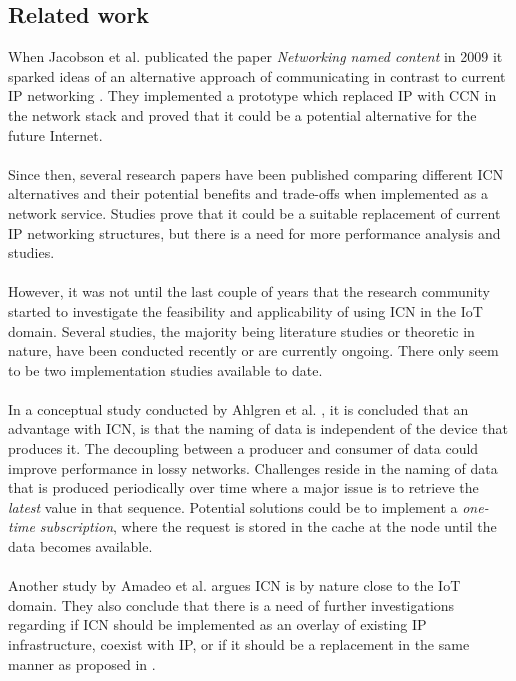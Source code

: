 \subsection{Related work}
When Jacobson et al. publicated the paper \textit{Networking named content} in 2009 it sparked ideas of an alternative approach of communicating in contrast to current IP networking \cite{Jacobson2009}. They implemented a prototype which replaced IP with CCN in the network stack and proved that it could be a potential alternative for the future Internet.\\\\
Since then, several research papers have been published comparing different ICN alternatives and their potential benefits and trade-offs when implemented as a network service\cite{Ahlgren2012}. Studies prove that it could be a suitable replacement of current IP networking structures, but there is a need for more performance analysis and studies\cite{Ahlgren2012}\cite{Greek-ICN-networking-survey-2014}.\\\\
However, it was not until the last couple of years that the research community started to investigate the feasibility and applicability of using ICN in the IoT domain. Several studies, the majority being literature studies or theoretic in nature, have been conducted recently or are currently ongoing. There only seem to be two implementation studies available to date.\\\\
In a conceptual study conducted by Ahlgren et al. \cite{Ahlgreniot}, it is concluded that an advantage with ICN, is that the naming of data is independent of the device that produces it. The decoupling between a producer and consumer of data could improve performance in lossy networks. Challenges reside in the naming of data that is produced periodically over time where a major issue is to retrieve the \textit{latest} value in that sequence. Potential solutions could be to implement a \textit{one-time subscription}, where the request is stored in the cache at the node until the data becomes available\cite{Ahlgreniot}.\\\\
Another study by Amadeo et al. \cite{iotchop} argues ICN is by nature close to the IoT domain. They also conclude that there is a need of further investigations regarding if ICN should be implemented as an overlay of existing IP infrastructure, coexist with IP, or if it should be a replacement in the same manner as proposed in \cite{Jacobson2009}.\\\\
